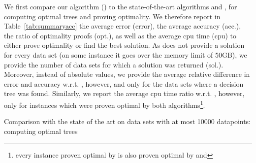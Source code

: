 \documentclass{llncs}
\begin{document}
We first compare our algorithm (\budalg) to the state-of-the-art algorithms \murtree and \dleight, for computing optimal trees and proving optimality. We therefore report in Table~\ref{tab:summaryacc} the average error (error), the average accuracy (acc.), 
the ratio of optimality proofs (opt.), as well as the average cpu time (cpu) to either prove optimality or find the best solution.
As \dleight does not provide a solution for every data set (on some instance it goes over the memory limit of 50GB), we provide the number of data sets for which a solution was returned (sol.). Moreover, 
instead of absolute values, we provide the average relative difference in error and accuracy w.r.t. \budalg, however, and only for the data sets where a decision tree was found. Similarly, we report the average cpu time ratio w.r.t. \budalg, however, only for instances which were proven optimal by both algorithms\footnote{every instance proven optimal by \dleight is also proven optimal by \budalg and \murtree}.


%
%
%


% 


\begin{table}[htbp]
\begin{center}
\begin{footnotesize}
\tabcolsep=1.7pt

\end{footnotesize}
\end{center}
\caption{\label{tab:summaryaccsmall} Comparison with the state of the art on data sets with at most 10000 datapoints: computing optimal trees}
\end{table}
\end{document}

